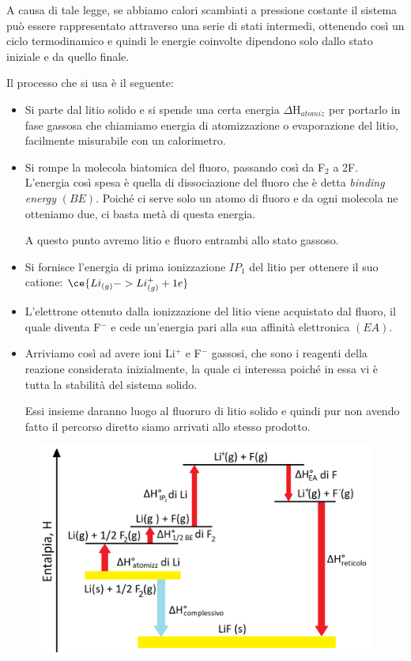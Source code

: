 \vspace{0.2cm}A causa di tale legge, se abbiamo calori scambiati a pressione costante il sistema può essere rappresentato attraverso una serie di stati intermedi, ottenendo così un ciclo termodinamico e quindi le energie coinvolte dipendono solo dallo stato iniziale e da quello finale.

\vspace{0.2cm}Il processo che si usa è il seguente:
\begin{itemize}
    \item Si parte dal litio solido e si spende una certa energia $\Delta\text{H}_{atomiz}$ per portarlo in fase gassosa che chiamiamo energia di atomizzazione o evaporazione del litio, facilmente misurabile con un calorimetro.
    \item Si rompe la molecola biatomica del fluoro, passando così da F$_2$ a 2F. L'energia così spesa è quella di dissociazione del fluoro che è detta \textit{binding energy} $(BE)$. Poiché ci serve solo un atomo di fluoro e da ogni molecola ne otteniamo due, ci basta metà di questa energia.
    
    A questo punto avremo litio e fluoro entrambi allo stato gassoso.
    \item Si fornisce l'energia di prima ionizzazione $IP_1$ del litio per ottenere il suo catione: $\ce{Li_{(g)} -> Li^{+}_{(g)} + 1e}$
    \item L'elettrone ottenuto dalla ionizzazione del litio viene acquistato dal fluoro, il quale diventa F$^-$ e cede un'energia pari alla sua affinità elettronica $(EA)$.
    \item Arriviamo così ad avere ioni Li$^+$ e F$^-$ gassosi, che sono i reagenti della reazione considerata inizialmente, la quale ci interessa poiché in essa vi è tutta la stabilità del sistema solido.
    
    Essi insieme daranno luogo al fluoruro di litio solido e quindi pur non avendo fatto il percorso diretto siamo arrivati allo stesso prodotto.
\end{itemize}

\vspace{-0.4cm}\begin{figure}[H]
    \centering
    \includegraphics[width=12cm]{immagini/Ciclo-Born-Haber.png}
\end{figure}

